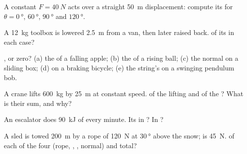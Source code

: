\begin{exercise}[$\star$]\label{exo:g11:work-of-force:1}
A constant  $F = \qty{40}{N}$ acts over a straight \qty{50}{m}
displacement: compute its  for $\theta = \qty{0}{\degree}$,
$\qty{60}{\degree}$, $\qty{90}{\degree}$ and $\qty{120}{\degree}$.
\end{exercise}

\begin{exercise}[$\star$]\label{exo:g11:work-of-force:2}
A \qty{12}{kg} toolbox is lowered \qty{2.5}{m} from a van, then later
raised back.  of its  in each case?
\end{exercise}

\begin{exercise}[$\star$]\label{exo:g11:work-of-force:3}
,  or zero? (a) the  of a falling apple; (b) the
 of a rising ball; (c) the normal  on a sliding box; (d)
 on a braking bicycle; (e) the string's  on a swinging
pendulum bob.
\end{exercise}

\begin{exercise}[$\star$]\label{exo:g11:work-of-force:4}
A crane lifts \qty{600}{kg} by \qty{25}{m} at constant speed.  of
the lifting  and of the ? What is their sum, and why?
\end{exercise}

\begin{exercise}[$\star$]\label{exo:g11:work-of-force:5}
An escalator  does \qty{90}{kJ} of  every minute. Its 
in ? In ?
\end{exercise}

\begin{exercise}[$\star\star$]\label{exo:g11:work-of-force:6}
A sled is towed \qty{200}{m} by a rope of  \qty{120}{N} at
$\qty{30}{\degree}$ above the snow;  is \qty{45}{N}.  of
each of the four  (rope, , , normal) and total?
\end{exercise}

